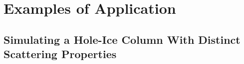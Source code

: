
\section{Examples of Application}
\label{sec:applications}

\subsection{Simulating a Hole-Ice Column With Distinct Scattering Properties}
\label{sec:scattering_simulation}

